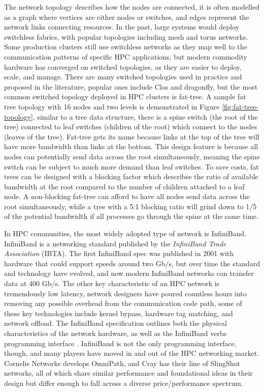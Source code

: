 The network topology describes how the nodes are connected, it is often modelled as a graph where vertices are either nodes or switches, and edges represent the network links connecting resources.
In the past, large systems would deploy switchless fabrics, with popular topologies including mesh and torus networks.
Some production clusters still use switchless networks as they map well to the communication patterns of specific HPC applications, but modern commodity hardware has converged on switched topologies, as they are easier to deploy, scale, and manage. 
There are many switched topologies used in practice and proposed in the literature, popular ones include Clos and dragonfly, but the most common switched topology deployed in HPC clusters is fat-tree.
A sample fat tree topology with 16 nodes and two levels is demonstrated in Figure \ref{fig:fat-tree-topology}, similar to a tree data structure, there is a spine switch (the root of the tree) connected to leaf switches (children of the root) which connect to the nodes (leaves of the tree).
Fat-tree gets its name because links at the top of the tree will have more bandwidth than links at the bottom.
This design feature is because all nodes can potentially send data across the root simultaneously, meaning the spine switch can be subject to much more demand than leaf switches.
To save costs, fat trees can be designed with a blocking factor which describes the ratio of available bandwidth at the root compared to the number of children attached to a leaf node.
A non-blocking fat-tree can afford to have all nodes send data across the root simultaneously, while a tree with a 5:1 blocking ratio will grind down to 1/5 of the potential bandwidth if all processes go through the spine at the same time.

In HPC communities, the most widely adopted type of network is InfiniBand. 
InfiniBand is a networking standard published by the \textit{InfiniBand Trade Association} (IBTA).
The first InfiniBand spec was published in 2001 with hardware that could support speeds around two Gb/s, but over time the standard and technology have evolved, and now modern InfiniBand networks can transfer data at 400 Gb/s.
The other key characteristic of an HPC network is tremendously low latency, network designers have poured countless hours into removing any possible overhead from the communication code path, some of these key technologies include kernel bypass, hardware tag matching, and network offload.
The InfiniBand specification outlines both the physical characteristics of the network hardware, as well as the InfiniBand verbs programming interface \cite{IBSpec}.
InfiniBand is not the only programming interface, though, and many players have moved in and out of the HPC networking market.
Cornelis Networks develops OmniPath, and Cray has their line of SlingShot networks, all of which share similar performance and foundational ideas in their design but differ enough to fall across a diverse price/performance spectrum.

